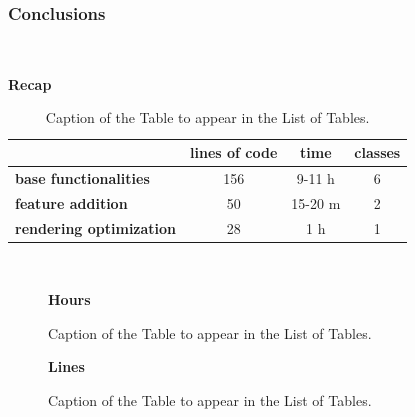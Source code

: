 \subsubsection{Conclusions} \mbox{} \\
\label{subpar:render_optimizations_inherited_widget}
\begin{table}[H]
    \caption*{\textbf{Recap}}
    \centering 
    
    \begin{tabular}{| l | c | c | c |}
    \hline
    \rowcolor{bluepoli!40} %
    \hline
     & \textbf{lines of code} & \textbf{time} & \textbf{classes} \T\B \\
    \hline
    \textbf{base functionalities} & 156 & 9-11 h & 6 \T\B \\ 
    \textbf{feature addition} & 50 & 15-20 m & 2 \T\B\\ 
    \textbf{rendering optimization} & 28 & 1 h & 1
    \T\B\\
    \hline
    \end{tabular}
    \\[10pt]
    \caption{Caption of the Table to appear in the List of Tables.}
    \label{table:example}
\end{table}

\begin{figure}[H]
 \caption*{\textbf{Hours}}
\centering
{}
 \caption{Caption of the Table to appear in the List of Tables.}
\end{figure}
\begin{figure}[H]

\caption*{\textbf{Lines}}
\centering
{}
 \caption{Caption of the Table to appear in the List of Tables.}
\end{figure}



